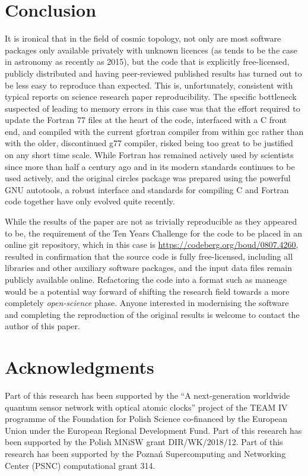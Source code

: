 \section{Conclusion}

\fussy
It is ironical that in the field of cosmic topology, not only are most
software packages only available privately with unknown licences (as
tends to be the case in astronomy as recently as
2015\supercite{Allen18}), but the code that is explicitly
free-licensed, publicly distributed and having peer-reviewed published
results has turned out to be less easy to reproduce than
expected. This is, unfortunately, consistent with typical reports on
science research paper
reproducibility\supercite{Ioannidis2009,Chang15,Stodden18}.  The
specific bottleneck suspected of leading to memory errors in this case
was that the effort required to update the Fortran 77 files at the
heart of the code, interfaced with a C front end, and compiled with
the current {\sc gfortran} compiler from within {\sc gcc} rather than
with the older, discontinued\supercite{Burley01g77} {\sc g77}
compiler, risked being too great to be justified on any short time
scale. While Fortran has remained actively used by scientists since
more than half a century ago and in its modern standards continues to
be used actively, and the original {\sc circles} package was prepared
using the powerful GNU {\sc autotools}, a robust interface and
standards for compiling C and Fortran code together have only evolved
quite recently\supercite{GCCISOFortranC}.

While the results of the paper are not as trivially reproducible as
they appeared to be, the requirement of the Ten Years Challenge for
the code to be placed in an online git repository, which in this case
is \url{https://codeberg.org/boud/0807.4260}, resulted in confirmation
that the source code is fully free-licensed, including all libraries
and other auxiliary software packages, and the input data files remain
publicly available online. Refactoring the code into a format such as
{\sc maneage}\supercite{Akhlaghi15,Akhlaghi2020} would be a potential
way forward of shifting the research field towards a more
completely \emph{open-science} phase. Anyone interested in modernising
the software and completing the reproduction of the original results
is welcome to contact the author of this paper.

\section*{Acknowledgments}
{\footnotesize Part of this research has been supported by the ``A
  next-generation worldwide quantum sensor network with optical atomic
  clocks'' project of the TEAM IV programme of the Foundation for
  Polish Science co-financed by the European Union under the European
  Regional Development Fund.  Part of this research has been supported
  by the Polish MNiSW grant DIR/WK/2018/12.  Part of this research has
  been supported by the Pozna\'n Supercomputing and Networking Center
  (PSNC) computational grant 314.}
